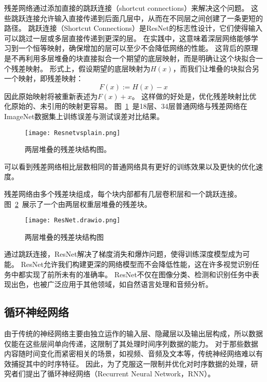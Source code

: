 残差网络通过添加直接的跳跃连接（shortcut connections）来解决这个问题。
这些跳跃连接允许输入直接传递到后面几层中，从而在不同层之间创建了一条更短的路径。
跳跃连接（Shortcut Connections）是ResNet的标志性设计，它们使得输入可以跳过一层或多层直接传递到更深的层。
在实践中，这意味着深层网络能够学习到一个恒等映射，确保增加的层可以至少不会降低网络的性能。
这背后的原理是不再利用多层堆叠的块直接拟合一个期望的底层映射，而是明确让这个块拟合一个残差映射。
形式上，假设期望的底层映射为$H(x)$，而我们让堆叠的块拟合另一个映射，即残差映射：
\begin{equation}
  \label{eq:residual_mapping}
  F(x) := H(x) - x
\end{equation}
因此原始映射将被重新表述为$F(x) + x$。
这样做的好处是，优化残差映射比优化原始的、未引用的映射更容易。
图~\ref{fig:Resnetvsplai}~是18层、34层普通网络与残差网络在ImageNet数据集上训练误差与测试误差对比结果。
\begin{figure}[htbp]
  \centering
  \texttt{[image: Resnetvsplain.png]}
  \caption{两层堆叠的残差块结构图\cite{he2016deep}。}
  \label{fig:Resnetvsplai}
\end{figure}
可以看到残差网络相比层数相同的普通网络具有更好的训练效果以及更快的优化速度。



残差网络由多个残差块组成，每个块内部都有几层卷积层和一个跳跃连接。
图~\ref{fig:resnet_structure}~展示了一个由两层权重层堆叠的残差块。
\begin{figure}[htbp]
  \centering
  \texttt{[image: ResNet.drawio.png]}
  \caption{两层堆叠的残差块结构图}
  \label{fig:resnet_structure}
\end{figure}
通过跳跃连接，ResNet解决了梯度消失和爆炸问题，使得训练深度模型成为可能。
ResNet允许我们构建更深的网络模型而不会降低性能，这在许多视觉识别任务中都实现了前所未有的准确率。
ResNet不仅在图像分类、检测和识别任务中表现出色，也被广泛应用于其他领域，如自然语言处理和音频分析。

\subsection{循环神经网络}
由于传统的神经网络主要由独立运作的输入层、隐藏层以及输出层构成，所以数据仅能在这些层间单向传递，这限制了其处理时间序列数据的能力。
对于那些数据内容随时间变化而紧密相关的场景，如视频、音频及文本等，传统神经网络难以有效捕捉其中的时序特征。
因此，为了克服这一限制并优化对时序数据的处理，研究者们提出了循环神经网络（Recurrent Neural Network，RNN）。


